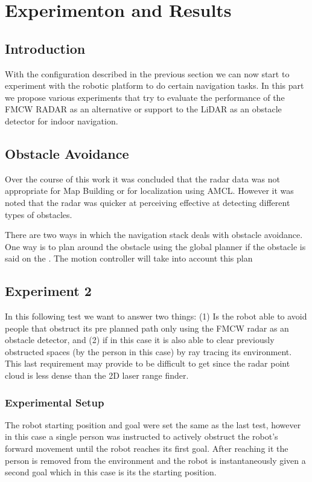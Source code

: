 \chapter{Experimenton and Results}

\section{Introduction}
With the configuration described in the previous section we can now start to experiment with the robotic platform to do certain navigation tasks. In this part we propose various experiments that try to evaluate the  performance of the \ac{FMCW} \ac{RADAR} as an alternative or support to the \ac{LiDAR} as an obstacle detector for indoor navigation.
\section{Obstacle Avoidance}
Over the course of this work it was concluded that the radar data was not appropriate for Map Building or for localization using \ac{AMCL}. However it was noted that the radar was quicker at perceiving effective at detecting different types of obstacles. 


There are two ways in which the navigation stack deals with obstacle avoidance. One way is to plan around the obstacle using the global planner if the obstacle is said on the .
The motion controller will take into account this plan 


\section {Experiment 2}
In this following test we want to answer two things: (1) Is the robot able to avoid people that obstruct its pre planned path only using the  \ac{FMCW} radar as an obstacle detector, and (2) if in this case it is also able to clear previously obstructed spaces (by the person in this case) by ray tracing its environment. This last requirement may provide to be difficult to get since the radar point cloud is less dense than the 2D laser range finder.
\subsection{Experimental Setup}
The robot starting position and goal were set the same as the last test, however in this case a single person was instructed to actively obstruct the robot's forward movement until the robot reaches its first goal. After reaching it the person is removed from the environment  and the robot is  instantaneously given a second goal which in this case is its the starting position. 
